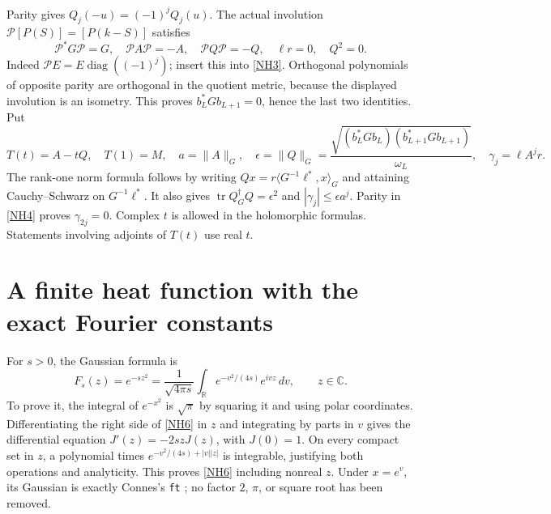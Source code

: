 \documentclass[11pt]{article}
\newcommand{\C}{\mathbb C}\newcommand{\R}{\mathbb R}
\newcommand{\tr}{\operatorname{tr}}\newcommand{\dd}{\dagger_G}
\newcommand{\eps}{\epsilon}\newcommand{\spec}{\operatorname{spec}}
\begin{document}
Parity gives \(Q_j(-u)=(-1)^jQ_j(u)\).
The actual involution \(\mathcal P[P(S)]=[P(k-S)]\)
satisfies
\begin{equation}\tag{NH4}\label{NH4}
\mathcal P^*G\mathcal P=G,\quad
\mathcal P A\mathcal P=-A,\quad
\mathcal P Q\mathcal P=-Q,\quad
\ell r=0,\quad Q^2=0 .
\end{equation}
Indeed \(\mathcal P E=E\operatorname{diag}((-1)^j)\);
insert this into \eqref{NH3}. Orthogonal polynomials of
opposite parity are orthogonal in the quotient metric,
because the displayed involution is an isometry.
This proves \(b_L^*Gb_{L+1}=0\), hence the last two
identities. Put
\begin{equation}\tag{NH5}\label{NH5}
T(t)=A-tQ,\quad T(1)=M,\quad
a=\|A\|_G,\quad
\eps=\|Q\|_G
=\frac{\sqrt{(b_L^*Gb_L)(b_{L+1}^*Gb_{L+1})}}{\omega_L},
\quad \gamma_j=\ell A^jr .
\end{equation}
The rank-one norm formula follows by writing
\(Qx=r\langle G^{-1}\ell^*,x\rangle_G\) and attaining
Cauchy--Schwarz on \(G^{-1}\ell^*\). It also gives
\(\tr Q^\dd Q=\eps^2\) and
\(|\gamma_j|\le\eps a^j\).
Parity in \eqref{NH4} proves \(\gamma_{2j}=0\).
Complex \(t\) is allowed in the holomorphic formulas.
Statements involving adjoints of \(T(t)\) use real \(t\).

\section{A finite heat function with the exact Fourier constants}

For \(s>0\), the Gaussian formula is
\begin{equation}\tag{NH6}\label{NH6}
F_s(z)=e^{-sz^2}
=\frac1{\sqrt{4\pi s}}\int_\R e^{-v^2/(4s)}e^{ivz}\,dv,
\qquad z\in\C .
\end{equation}
To prove it, the integral of \(e^{-x^2}\) is \(\sqrt\pi\)
by squaring it and using polar coordinates. Differentiating
the right side of \eqref{NH6} in \(z\) and integrating
by parts in \(v\) gives the differential equation
\(J'(z)=-2szJ(z)\), with \(J(0)=1\).
On every compact set in \(z\), a polynomial times
\(e^{-v^2/(4s)+|v||z|}\) is integrable, justifying both
operations and analyticity. This proves \eqref{NH6}
including nonreal \(z\). Under \(x=e^v\), its Gaussian
is exactly Connes's \texttt{ft} \cite{ConnesHeat};
no factor \(2\), \(\pi\), or square root has been removed.
\end{document}
